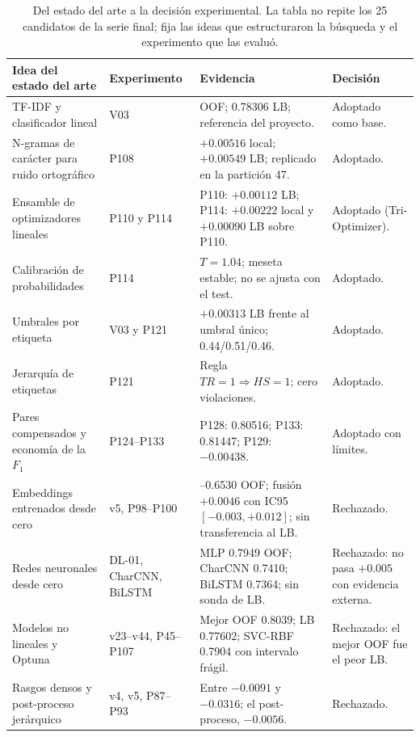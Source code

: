 \begin{table}[t]
\centering
\caption{Del estado del arte a la decisión experimental. La tabla no repite
los 25 candidatos de la serie final; fija las ideas que estructuraron la
búsqueda y el experimento que las evaluó.}
\label{tab:sota}
\scriptsize
\begin{tabularx}{\textwidth}{@{}>{\raggedright\arraybackslash}p{4.7cm}>{\raggedright\arraybackslash}p{2.0cm}>{\raggedright\arraybackslash}X>{\raggedright\arraybackslash}p{2.1cm}@{}}
\toprule
Idea del estado del arte & Experimento & Evidencia & Decisión \\
\midrule
TF-IDF y clasificador lineal \cite{salton1988term,joachims1998text} & V03 & 0.777211 OOF; 0.78306 LB; referencia del proyecto. & Adoptado como base. \\
N-gramas de carácter para ruido ortográfico \cite{cavnar1994ngram,mcnamee2004character} & P108 & $+0.00516$ local; $+0.00549$ LB; replicado en la partición 47. & Adoptado. \\
Ensamble de optimizadores lineales \cite{breiman1996bagging,wolpert1992stacked,bottou2010large,defazio2014saga,zou2005regularization} & P110 y P114 & P110: $+0.00112$ LB; P114: $+0.00222$ local y $+0.00090$ LB sobre P110. & Adoptado (Tri-Optimizer). \\
Calibración de probabilidades \cite{platt1999probabilistic,guo2017calibration} & P114 & $T=1.04$; meseta estable; no se ajusta con el test. & Adoptado. \\
Umbrales por etiqueta \cite{lipton2014thresholding,nan2012optimizing} & V03 y P121 & $+0.00313$ LB frente al umbral único; 0.44/0.51/0.46. & Adoptado. \\
Jerarquía de etiquetas \cite{silla2011survey,basile2019hateval} & P121 & Regla $TR=1\Rightarrow HS=1$; cero violaciones. & Adoptado. \\
Pares compensados y economía de la $F_1$ \cite{flach2003geometry,saito2015precision} & P124--P133 & P128: 0.80516; P133: 0.81447; P129: $-0.00438$. & Adoptado con límites. \\
Embeddings entrenados desde cero \cite{bojanowski2017enriching} & v5, P98--P100 & 0.6522--0.6530 OOF; fusión $+0.0046$ con IC95 $[-0.003,+0.012]$; sin transferencia al LB. & Rechazado. \\
Redes neuronales desde cero & DL-01, CharCNN, BiLSTM & MLP 0.7949 OOF; CharCNN 0.7410; BiLSTM 0.7364; sin sonda de LB. & Rechazado: no pasa $+0.005$ con evidencia externa. \\
Modelos no lineales y Optuna & v23--v44, P45--P107 & Mejor OOF 0.8039; LB 0.77602; SVC-RBF 0.7904 con intervalo frágil. & Rechazado: el mejor OOF fue el peor LB. \\
Rasgos densos y post-proceso jerárquico & v4, v5, P87--P93 & Entre $-0.0091$ y $-0.0316$; el post-proceso, $-0.0056$. & Rechazado. \\
\bottomrule
\end{tabularx}
\end{table}

